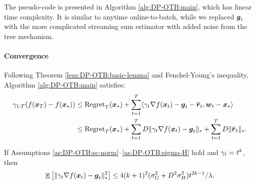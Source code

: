 The pseudo-code is presented in Algorithm \ref{alg:DP-OTB:main}, which has linear time complexity. It is similar to anytime online-to-batch, while we replaced ${\boldsymbol{g}}_t$ with the more complicated streaming sum estimator with added noise from the tree mechanism.



\paragraph{Convergence}

Following Theorem \ref{lem:DP-OTB:basic-lemma} and Fenchel-Young's inequality, Algorithm \ref{alg:DP-OTB:main} satisfies:
\begin{align}
    \label{eq:DP-OTB:basic-decomposition}
    \gamma_{1:T}(f({\boldsymbol{x}}_T)-f({\boldsymbol{x}}_\ast)) 
    &\leq \mathrm{Regret}_T({\boldsymbol{x}}_\ast) + \sum_{t=1}^T \langle \gamma_t\nabla f({\boldsymbol{x}}_t) - {\boldsymbol{g}}_t - \overline{{\boldsymbol{r}}}_t, {\boldsymbol{w}}_t - {\boldsymbol{x}}_\ast\rangle \\
    &\leq \mathrm{Regret}_T({\boldsymbol{x}}_\ast) + \sum_{t=1}^T D\|\gamma_t\nabla f({\boldsymbol{x}}_t)-{\boldsymbol{g}}_t\|_\ast + \sum_{t=1}^T D\|\overline{{\boldsymbol{r}}}_t\|_\ast.
    \label{eq:DP-OTB:basic-decomposition-2}
\end{align}

\begin{lemma}
\label{lem:DP-OTB:variance-expectation-bound}
If Assumptions \ref{as:DP-OTB:sc-norm}--\ref{as:DP-OTB:sigma-H} hold and $\gamma_t = t^k$, then
\begin{equation}
    \mathop{\mathbb{E}}\left[\|\gamma_t\nabla f({\boldsymbol{x}}_t)-{\boldsymbol{g}}_t\|_\ast^2\right] \le 4(k+1)^2(\sigma_G^2+D^2\sigma_H^2)t^{2k-1}/\lambda.
    \label{eq:DP-OTB:variance-norm}
\end{equation}
\end{lemma}

